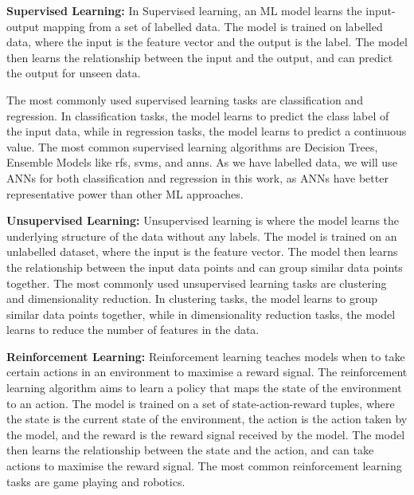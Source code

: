 \textbf{Supervised Learning:} In Supervised learning, an ML model learns the input-output mapping from a set of labelled data. The model is trained on labelled data, where the input is the feature vector and the output is the label. The model then learns the relationship between the input and the output, and can predict the output for unseen data. 

The most commonly used supervised learning tasks are classification and regression. In classification tasks, the model learns to predict the class label of the input data, while in regression tasks, the model learns to predict a continuous value. The most common supervised learning algorithms are Decision Trees,  Ensemble Models like \glspl{rf},  \glspl{svm}, and \glspl{ann}. As we have labelled data, we will use ANNs for both classification and regression in this work, as ANNs have better representative power than other ML approaches.

\textbf{Unsupervised Learning:} Unsupervised learning is where the model learns the underlying structure of the data without any labels. The model is trained on an unlabelled dataset, where the input is the feature vector. The model then learns the relationship between the input data points and can group similar data points together. The most commonly used unsupervised learning tasks are clustering and dimensionality reduction. In clustering tasks, the model learns to group similar data points together, while in dimensionality reduction tasks, the model learns to reduce the number of features in the data.

\textbf{Reinforcement Learning:} Reinforcement learning teaches models when to take certain actions in an environment to maximise a reward signal. The reinforcement learning algorithm aims to learn a policy that maps the state of the environment to an action. The model is trained on a set of state-action-reward tuples, where the state is the current state of the environment, the action is the action taken by the model, and the reward is the reward signal received by the model. The model then learns the relationship between the state and the action, and can take actions to maximise the reward signal. The most common reinforcement learning tasks are game playing and robotics.


